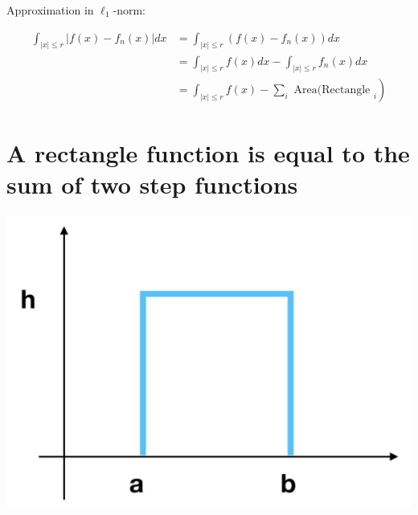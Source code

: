 \documentclass[10pt]{article}
\begin{document}
Approximation in $\ell_{1}$-norm:

$$
\begin{aligned}
\int_{|x| \leq r}\left|f(x)-f_{n}(x)\right| d x & =\int_{|x| \leq r}\left(f(x)-f_{n}(x)\right) d x \\
& =\int_{|x| \leq r} f(x) d x-\int_{|x| \leq r} f_{n}(x) d x \\
& \left.=\int_{|x| \leq r} f(x)-\sum_{i} \text { Area(Rectangle }_{i}\right)
\end{aligned}
$$

\section*{A rectangle function is equal to the sum of two step functions}
\begin{center}
\includegraphics[max width=\textwidth]{2024_01_08_0e0dcffe4bc8c6049046g-23}
\end{center}
\end{document}

